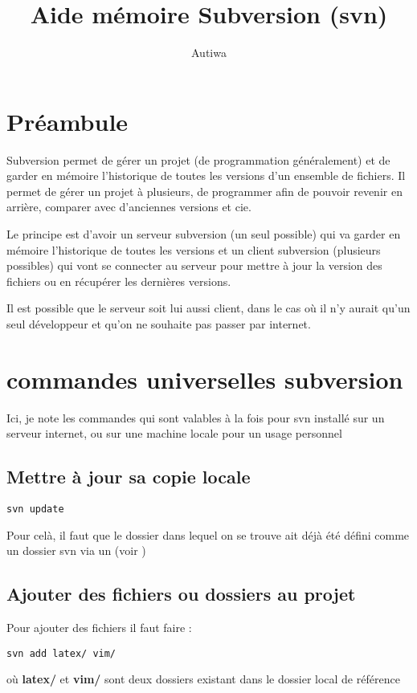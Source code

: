 \documentclass[a4paper,twoside]{article}
\title{Aide mémoire Subversion (svn)}
\author{Autiwa}
\begin{document}
\tableofcontents

\clearpage

\section{Préambule}
Subversion permet de gérer un projet (de programmation généralement) et de garder en mémoire l'historique de toutes les versions d'un ensemble de fichiers. Il permet de gérer un projet à plusieurs, de programmer afin de pouvoir revenir en arrière, comparer avec d'anciennes versions et cie. 

Le principe est d'avoir un serveur subversion (un seul possible) qui va garder en mémoire l'historique de toutes les versions et un client subversion (plusieurs possibles) qui vont se connecter au serveur pour mettre à jour la version des fichiers ou en récupérer les dernières versions.

\begin{remarque}
Il est possible que le serveur soit lui aussi client, dans le cas où il n'y aurait qu'un seul développeur et qu'on ne souhaite pas passer par internet.
\end{remarque}

\section{commandes universelles subversion}
Ici, je note les commandes qui sont valables à la fois pour svn installé sur un serveur internet, ou sur une machine locale pour un usage personnel

\subsection{Mettre à jour sa copie locale}
\begin{verbatim}
svn update
\end{verbatim}

Pour celà, il faut que le dossier dans lequel on se trouve ait déjà été défini comme un dossier svn via un  (voir )

\subsection{Ajouter des fichiers ou dossiers au projet}
Pour ajouter des fichiers il faut faire :
\begin{verbatim}
svn add latex/ vim/ 
\end{verbatim}
où \textbf{latex/} et \textbf{vim/} sont deux dossiers existant dans le dossier local de référence
\end{document}
